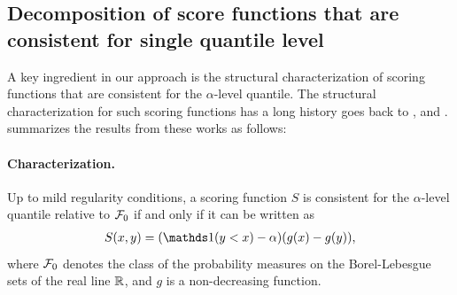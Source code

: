 



\subsection{Decomposition of score functions that are consistent for single quantile level}
\label{subsec:decomp_single_q}

A key ingredient in our approach is the structural characterization of scoring functions that are consistent for the $\alpha$-level quantile. The structural characterization for such scoring functions has a long history goes back to \cite{savage1971decompose}, \cite{thomson1979decompose} and \cite{gneiting2011point}. \cite{ehm2016binarydecomp} summarizes the results from these works as follows:

\paragraph{Characterization.}
Up to mild regularity conditions, a scoring function $S$ is consistent for the $\alpha$-level quantile relative to $\mathcal{F}_0$ if and only if it can be written as
\begin{align}\label{eq:q_consistent_score}
S(x,y) = (\one(y<x)-\alpha)(g(x)-g(y)),
\end{align}
where $\mathcal{F}_0$ denotes the class of the probability measures on the Borel-Lebesgue sets of the real line $\mathbb{R}$, and $g$ is a non-decreasing function. 

